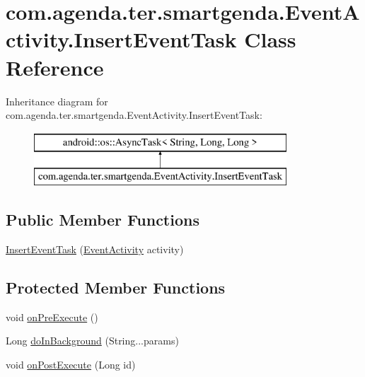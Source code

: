 \hypertarget{classcom_1_1agenda_1_1ter_1_1smartgenda_1_1_event_activity_1_1_insert_event_task}{\section{com.\-agenda.\-ter.\-smartgenda.\-Event\-Activity.\-Insert\-Event\-Task Class Reference}
\label{classcom_1_1agenda_1_1ter_1_1smartgenda_1_1_event_activity_1_1_insert_event_task}
}
Inheritance diagram for com.\-agenda.\-ter.\-smartgenda.\-Event\-Activity.\-Insert\-Event\-Task\-:\begin{figure}[H]
\begin{center}
\leavevmode
\includegraphics[height=2.000000cm]{classcom_1_1agenda_1_1ter_1_1smartgenda_1_1_event_activity_1_1_insert_event_task}
\end{center}
\end{figure}
\subsection*{Public Member Functions}
\begin{DoxyCompactItemize}
\item 
\hyperlink{classcom_1_1agenda_1_1ter_1_1smartgenda_1_1_event_activity_1_1_insert_event_task_a46547767b412153a1771f2884570c6b1}{Insert\-Event\-Task} (\hyperlink{classcom_1_1agenda_1_1ter_1_1smartgenda_1_1_event_activity}{Event\-Activity} activity)
\end{DoxyCompactItemize}
\subsection*{Protected Member Functions}
\begin{DoxyCompactItemize}
\item 
void \hyperlink{classcom_1_1agenda_1_1ter_1_1smartgenda_1_1_event_activity_1_1_insert_event_task_a534b8525d0d5114b80a21115bccb5a5c}{on\-Pre\-Execute} ()
\item 
Long \hyperlink{classcom_1_1agenda_1_1ter_1_1smartgenda_1_1_event_activity_1_1_insert_event_task_aed0760eee3036e7111b8c92d4e75c827}{do\-In\-Background} (String...\-params)
\item 
void \hyperlink{classcom_1_1agenda_1_1ter_1_1smartgenda_1_1_event_activity_1_1_insert_event_task_a6e5a96e94a054ace9971d3921a840f15}{on\-Post\-Execute} (Long id)
\end{DoxyCompactItemize}


